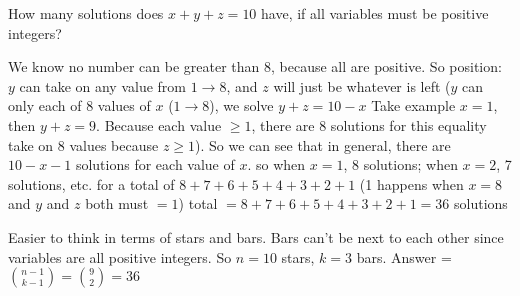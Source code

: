 \question How many solutions does $x + y + z = 10$ have, if all variables 
must be positive integers? 

\begin{solution}[1 in]
We know no number can be greater than 8, because all are positive.
So position: $y$ can take on any value from $1 \rightarrow 8$, and $z$ will just be 
whatever is left ($y$ can only each of 8 values of $x$ 
($1 \rightarrow 8$), we solve $y + z = 10 - x$
Take example $x = 1$, then $y + z = 9$. Because each value $\ge 1$, there 
are 8 solutions for this equality take on 8 values because $z \ge 1$).
So we can see that in general, there are $10-x-1$ solutions for each 
value of $x$.
so when $x = 1$, 8 solutions; when $x = 2$, 7 solutions, etc. for a total 
of $8 + 7 + 6 + 5 + 4 + 3 + 2 + 1$ (1 happens when $x=8$ and $y$ and $z$ both must $= 1$)
total $= 8 + 7 + 6 + 5 + 4 + 3 + 2 + 1 = 36 $ solutions

Easier to think in terms of stars and bars. Bars can't be next to each 
other since variables are all positive integers. So $n = 10$ stars, 
$k = 3$ bars. Answer = ${n-1 \choose k-1} = {9 \choose 2} = 36$
\end{solution}